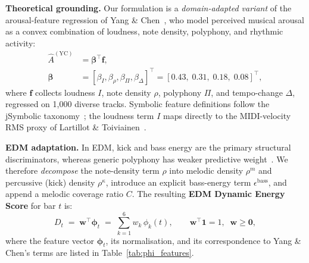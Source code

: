 \documentclass[conference]{IEEEtran}
\begin{document}
\textbf{Theoretical grounding.}
Our formulation is a \emph{domain-adapted variant} of the arousal-feature regression of Yang \& Chen~\cite{yang2012machine}, who model perceived musical arousal as a convex combination of loudness, note density, polyphony, and rhythmic activity:
\begin{align}\label{eq:yang_arousal}
  \hat{A}^{(\mathrm{YC})} &= \boldsymbol{\beta}^{\!\top}\mathbf{f}, \nonumber\\
  \boldsymbol{\beta} &= [\beta_{I},\beta_{\rho},\beta_{\Pi},\beta_{\Delta}]^{\!\top}
  = [0.43,\;0.31,\;0.18,\;0.08]^{\!\top},
\end{align}
where $\mathbf{f}$ collects loudness $I$, note density $\rho$, polyphony $\Pi$, and tempo-change $\Delta$, regressed on 1{,}000 diverse tracks.
Symbolic feature definitions follow the jSymbolic taxonomy~\cite{mckay2006jsymbolic}; the loudness term $I$ maps directly to the MIDI-velocity RMS proxy of Lartillot \& Toiviainen~\cite{lartillot2007mir}.

\textbf{EDM adaptation.}
In EDM, kick and bass energy are the primary structural discriminators, whereas generic polyphony has weaker predictive weight~\cite{zelechowski2021edm}.
We therefore \emph{decompose} the note-density term $\rho$ into melodic density $\rho^{m}$ and percussive (kick) density $\rho^{\kappa}$, introduce an explicit bass-energy term $\epsilon^{\mathrm{bass}}$, and append a melodic coverage ratio $C$.
The resulting \textbf{EDM Dynamic Energy Score} for bar $t$ is:
\begin{equation}\label{eq:energy}
  D_t \;=\; \boldsymbol{w}^{\!\top}\boldsymbol{\phi}_t
        \;=\; \sum_{k=1}^{6} w_k\,\phi_k(t),
  \qquad \boldsymbol{w}^{\!\top}\mathbf{1}=1,\;\; \boldsymbol{w}\geq\mathbf{0},
\end{equation}
where the feature vector $\boldsymbol{\phi}_t$, its normalisation, and its correspondence
to Yang \& Chen's terms are listed in Table~\ref{tab:phi_features}.
\end{document}
